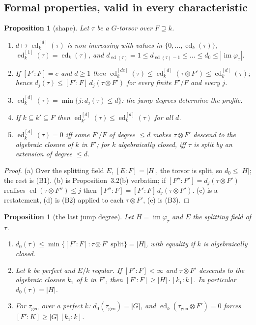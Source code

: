 \documentclass[11pt]{amsart}
\newtheorem{proposition}[theorem]{Proposition}
\theoremstyle{definition}
\theoremstyle{remark}
\newcommand{\ed}{\operatorname{ed}}
\newcommand{\edd}[1]{\ed^{[#1]}}
\newcommand{\im}{\operatorname{im}}
\newcommand{\gen}{\mathrm{gen}}
\newcommand{\stag}[1]{\hfill{\normalfont[#1]}}
\begin{document}
\subsection{Formal properties, valid in every characteristic}

\begin{proposition}[shape]\label{prop:shape}
Let $\tau$ be a $G$-torsor over $F\supseteq k$.
\begin{enumerate}
\item[(a)] $d\mapsto\edd d_k(\tau)$ is non-increasing with values in
$\{0,\dots,\ed_k(\tau)\}$, $\edd1_k(\tau)=\ed_k(\tau)$, and
$d_{\ed(\tau)}=1\le d_{\ed(\tau)-1}\le\dots\le d_0\le|\im\varphi_\tau|$.
\item[(b)] If $[F':F]=e$ and $d\ge1$ then $\edd{de}_k(\tau)\le\edd d_k(\tau\otimes
F')\le\edd d_k(\tau)$; hence $d_j(\tau)\le[F':F]\,d_j(\tau\otimes F')$ for every
finite $F'/F$ and every $j$.
\item[(c)] $\edd d_k(\tau)=\min\{j:d_j(\tau)\le d\}$: the jump degrees determine the
profile.
\item[(d)] If $k\subseteq k'\subseteq F$ then $\edd d_{k'}(\tau)\le\edd d_k(\tau)$
for all $d$.
\item[(e)] $\edd d_k(\tau)=0$ iff some $F'/F$ of degree $\le d$ makes $\tau\otimes
F'$ descend to the algebraic closure of $k$ in $F'$; for $k$ algebraically closed, iff
$\tau$ is split by an extension of degree $\le d$.
\end{enumerate}
\stag{proved}
\end{proposition}

\begin{proof}
(a) Over the splitting field $E$, $[E:F]=|H|$, the torsor is split, so
$d_0\le|H|$; the rest is (B1). (b) is Proposition~3.2(b) verbatim; if
$[F'':F']=d_j(\tau\otimes F')$ realises $\ed(\tau\otimes F'')\le j$ then
$[F'':F]=[F':F]\,d_j(\tau\otimes F')$. (c) is a restatement, (d) is (B2) applied to
each $\tau\otimes F'$, (e) is (B3).
\end{proof}

\begin{proposition}[the last jump degree]\label{prop:d0}
Let $H=\im\varphi_\tau$ and $E$ the splitting field of $\tau$.
\begin{enumerate}
\item[(a)] $d_0(\tau)\le\min\{[F':F]:\tau\otimes F'\text{ split}\}=|H|$, with
equality if $k$ is algebraically closed.
\item[(b)] Let $k$ be perfect and $E/k$ regular. If $[F':F]<\infty$ and
$\tau\otimes F'$ descends to the algebraic closure $k_1$ of $k$ in $F'$, then
$[F':F]\ge|H|\cdot[k_1:k]$. In particular $d_0(\tau)=|H|$.
\item[(c)] For $\tau_\gen$ over a perfect $k$: $d_0(\tau_\gen)=|G|$, and
$\ed_k(\tau_\gen\otimes F')=0$ forces $[F':K]\ge|G|\,[k_1:k]$.
\end{enumerate}
\stag{proved}
\end{proposition}
\end{document}
